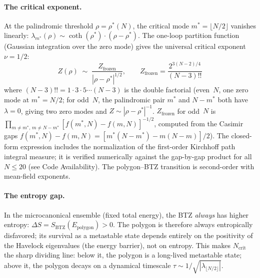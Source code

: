 \paragraph{The critical exponent.}
At the palindromic threshold $\rho = \rho^*(N)$, the critical mode
$m^* = \lfloor N/2\rfloor$ vanishes linearly:
$\lambda_{m^*}(\rho) \sim \coth(\rho^*) \cdot (\rho - \rho^*)$.
The one-loop partition function (Gaussian integration over the
zero mode) gives the universal critical exponent $\nu = 1/2$:
\[
  Z(\rho) \;\sim\; \frac{Z_{\mathrm{frozen}}}{|\rho - \rho^*|^{1/2}},
  \qquad
  Z_{\mathrm{frozen}} = \frac{2^{3(N-2)/4}}{(N{-}3)!!}
\]
where $(N{-}3)!! = 1 \cdot 3 \cdot 5 \cdots (N{-}3)$ is the double
factorial (even~$N$, one zero mode at $m^* = N/2$;
for odd~$N$, the palindromic pair $m^*$ and $N{-}m^*$ both
have $\lambda = 0$, giving two zero modes and
$Z \sim |\rho{-}\rho^*|^{-1}$.
$Z_{\mathrm{frozen}}$ for odd~$N$ is
$\prod_{m \ne m^*,\, m \ne N{-}m^*}
[f(m^*,N) - f(m,N)]^{-1/2}$,
computed from the Casimir gaps
$f(m^*,N) - f(m,N) = [m^*(N{-}m^*) - m(N{-}m)]/2$).
The closed-form expression includes the normalization of the
first-order Kirchhoff path integral measure; it is verified
numerically against the gap-by-gap product for all~$N \le 20$
(see Code Availability).
The polygon--BTZ transition is second-order with mean-field exponents.

\paragraph{The entropy gap.}
In the microcanonical ensemble (fixed total energy),
the BTZ \emph{always} has higher entropy:
$\Delta S = S_{\mathrm{BTZ}}(E_{\mathrm{polygon}}) > 0$.
The polygon is therefore always entropically disfavored;
its survival as a metastable state depends entirely on the
positivity of the Havelock eigenvalues (the energy barrier),
not on entropy.
This makes $N_{\mathrm{crit}}$ the sharp dividing line:
below it, the polygon is a long-lived metastable state;
above it, the polygon decays on a dynamical timescale
$\tau \sim 1/\sqrt{|\lambda_{\lfloor N/2\rfloor}|}$.

